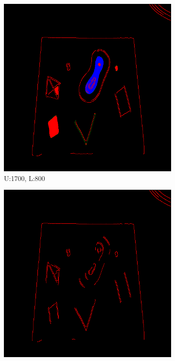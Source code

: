 \documentclass[11pt]{article}
\begin{document}
\begin{figure}[!h]
\centering
	\begin{subfigure}[t]{.25\textwidth}
		\centering
		\includegraphics[scale=0.3]{pics/normalThreshTest/Upper1700lower800kernel5.png}
		\caption{U:1700, L:800}
	\end{subfigure}
\hfill
	\begin{subfigure}[t]{.25\textwidth}
		\centering
		\includegraphics[scale=0.3]{pics/normalThreshTest/Upper1700lower1200kernel5.png}

\end{subfigure}
\end{figure}
\end{document}
